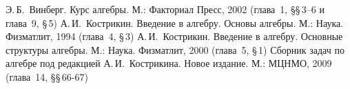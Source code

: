 \documentclass[a4paper,10pt]{amsart}
\theoremstyle{definition}
\theoremstyle{remark}
\begin{document}
\bigskip

\begin{thebibliography}{99}
Э.\,Б.~Винберг. Курс алгебры. М.: Факториал Пресс, 2002 (глава~1,
\S\S\,3--6 и глава~9, \S\,5)
А.\,И.~Кострикин. Введение в алгебру. Основы алгебры. М.: Наука.
Физматлит, 1994 (глава~4, \S\,3)
А.\,И.~Кострикин. Введение в алгебру. Основные структуры алгебры.
М.: Наука. Физматлит, 2000 (глава~5, \S\,1)
Сборник задач по алгебре под редакцией А.\,И.~Кострикина. Новое
издание. М.: МЦНМО, 2009 (глава~14, \S\S\,66-67)
\end{thebibliography}
\end{document}
